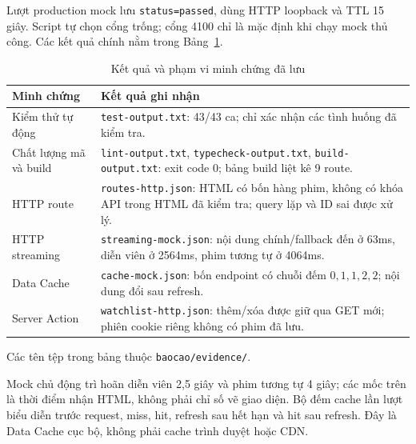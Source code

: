 \documentclass[12pt,a4paper]{extarticle}
\begin{document}
Lượt production mock lưu \texttt{status=passed}, dùng HTTP loopback và TTL 15 giây. Script tự chọn cổng trống; cổng 4100 chỉ là mặc định khi chạy mock thủ công. Các kết quả chính nằm trong Bảng~\ref{tab:evidence}.
\begin{table}[H]
\centering
\caption{Kết quả và phạm vi minh chứng đã lưu}
\label{tab:evidence}
\fontsize{9.5}{12.5}\selectfont
\renewcommand{\arraystretch}{1.1}
\begin{tabularx}{\textwidth}{|p{3.2cm}|X|}
\hline
\textbf{Minh chứng} & \textbf{Kết quả ghi nhận} \\
\hline
Kiểm thử tự động & \nolinkurl{test-output.txt}: 43/43 ca; chỉ xác nhận các tình huống đã kiểm tra. \\
\hline
Chất lượng mã và build & \nolinkurl{lint-output.txt}, \nolinkurl{typecheck-output.txt}, \nolinkurl{build-output.txt}: exit code 0; bảng build liệt kê 9 route. \\
\hline
HTTP route & \nolinkurl{routes-http.json}: HTML có bốn hàng phim, không có khóa API trong HTML đã kiểm tra; query lặp và ID sai được xử lý. \\
\hline
HTTP streaming & \nolinkurl{streaming-mock.json}: nội dung chính/fallback đến ở 63ms, diễn viên ở 2564ms, phim tương tự ở 4064ms. \\
\hline
Data Cache & \nolinkurl{cache-mock.json}: bốn endpoint có chuỗi đếm $0,1,1,2,2$; nội dung đổi sau refresh. \\
\hline
Server Action & \nolinkurl{watchlist-http.json}: thêm/xóa được giữ qua GET mới; phiên cookie riêng không có phim đã lưu. \\
\hline
\end{tabularx}
\end{table}
\noindent Các tên tệp trong bảng thuộc \nolinkurl{baocao/evidence/}.

Mock chủ động trì hoãn diễn viên 2,5 giây và phim tương tự 4 giây; các mốc trên là thời điểm nhận HTML, không phải chỉ số vẽ giao diện. Bộ đếm cache lần lượt biểu diễn trước request, miss, hit, refresh sau hết hạn và hit sau refresh. Đây là Data Cache cục bộ, không phải cache trình duyệt hoặc CDN.
\end{document}
